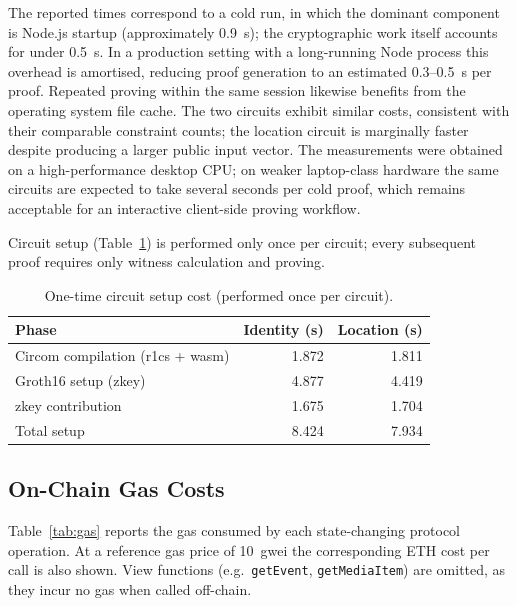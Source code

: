 \documentclass[11pt]{article}
\begin{document}
The reported times correspond to a cold run, in which the dominant component is
Node.js startup (approximately 0.9~s); the cryptographic work itself accounts
for under 0.5~s. In a production setting with a long-running Node process this
overhead is amortised, reducing proof generation to an estimated 0.3--0.5~s per
proof. Repeated proving within the same session likewise benefits from the
operating system file cache. The two circuits exhibit similar costs, consistent
with their comparable constraint counts; the location circuit is marginally
faster despite producing a larger public input vector. The measurements were
obtained on a high-performance desktop CPU; on weaker laptop-class hardware the
same circuits are expected to take several seconds per cold proof, which remains
acceptable for an interactive client-side proving workflow.

Circuit setup (Table~\ref{tab:setup}) is performed only once per circuit; every
subsequent proof requires only witness calculation and proving.

\begin{table}[ht]
\centering
\small
\caption{One-time circuit setup cost (performed once per circuit).}%
\label{tab:setup}
\begin{tabular}{lrr}
\toprule
Phase & Identity (s) & Location (s) \\
\midrule
Circom compilation (r1cs + wasm) & 1.872 & 1.811 \\
Groth16 setup (zkey)             & 4.877 & 4.419 \\
zkey contribution                & 1.675 & 1.704 \\
\midrule
Total setup                      & 8.424 & 7.934 \\
\bottomrule
\end{tabular}
\end{table}

\subsection{On-Chain Gas Costs}

Table~\ref{tab:gas} reports the gas consumed by each state-changing protocol
operation. At a reference gas price of 10~gwei the corresponding ETH cost per
call is also shown. View functions (e.g.\ \texttt{getEvent},
\texttt{getMediaItem}) are omitted, as they incur no gas when called off-chain.
\end{document}
